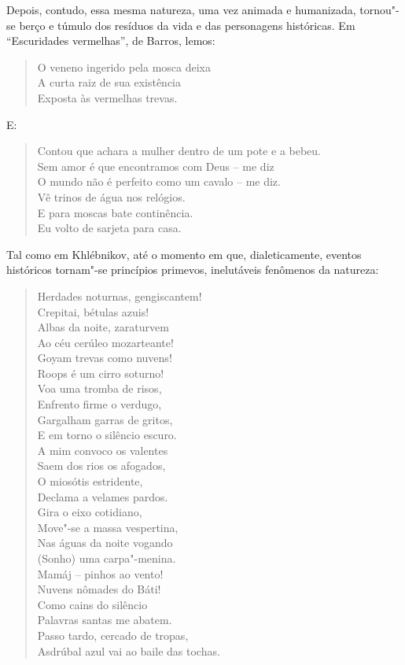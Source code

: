 Depois, contudo, essa mesma natureza, uma vez animada e humanizada,
tornou"-se berço e túmulo dos resíduos da vida e das personagens
históricas. Em ``Escuridades vermelhas'', de Barros, lemos:

\begin{verse}
O veneno ingerido pela mosca deixa \\
A curta raiz de sua existência \\
Exposta às vermelhas trevas.
\end{verse}

E:

\begin{verse}
Contou que achara a mulher dentro de um \qb{}pote e a bebeu. \\
Sem amor é que encontramos com Deus -- \qb{}me diz \\
O mundo não é perfeito como um cavalo -- \qb{}me diz. \\
Vê trinos de água nos relógios. \\
E para moscas bate continência. \\
Eu volto de sarjeta para casa.
\end{verse}

Tal como em Khlébnikov, até o momento em que, dialeticamente, eventos
históricos tornam"-se princípios primevos, inelutáveis fenômenos da
natureza:

\begin{verse}
Herdades noturnas, gengiscantem! \\
Crepitai, bétulas azuis! \\
Albas da noite, zaraturvem \\
Ao céu cerúleo mozarteante! \\
Goyam trevas como nuvens! \\
Roops é um cirro soturno! \\
Voa uma tromba de risos, \\
Enfrento firme o verdugo, \\
Gargalham garras de gritos, \\
E em torno o silêncio escuro. \\
A mim convoco os valentes \\
Saem dos rios os afogados, \\
O miosótis estridente, \\
Declama a velames pardos. \\
Gira o eixo cotidiano, \\
Move"-se a massa vespertina, \\
Nas águas da noite vogando \\
(Sonho) uma carpa"-menina. \\
Mamáj -- pinhos ao vento! \\
Nuvens nômades do Báti! \\
Como cains do silêncio \\
Palavras santas me abatem. \\
Passo tardo, cercado de tropas, \\
Asdrúbal azul vai ao baile das tochas.
  \end{verse}


